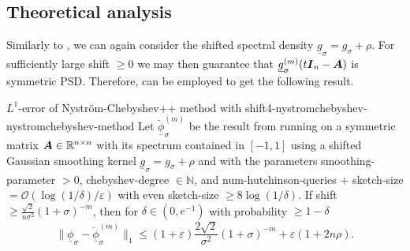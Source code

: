 
\subsection{Theoretical analysis}
\label{subsec:4-nystromchebyshev-analysis}

Similarly to , we can again consider
the shifted spectral density $\underline{g}_{\sigma} = g_{\sigma} + \rho$. For
sufficiently large \gls{shift} $\geq 0$ we may then guarantee that $\underline{g}_{\sigma}^{(m)}(t\boldsymbol{I}_n - \boldsymbol{A})$
is symmetric \gls{PSD}. Therefore,  can be
employed to get the following result.

\begin{theorem}{$L^1$-error of Nystr\"om-Chebyshev++ method with shift}{4-nystromchebyshev-nystromchebyshev-method}
    Let $\breve{\underline{\phi}}_{\sigma}^{(m)}$ be the result from running
     on a symmetric matrix
    $\boldsymbol{A} \in \mathbb{R}^{n \times n}$ with its spectrum contained in $[-1, 1]$
    using a shifted Gaussian smoothing kernel $\underline{g}_{\sigma} = g_{\sigma} + \rho$
    and with the parameters \gls{smoothing-parameter} $>0$, \gls{chebyshev-degree} $\in \mathbb{N}$, and
    \gls{num-hutchinson-queries} $+$ \gls{sketch-size} $=\mathcal{O}(\log(1/\delta)/\varepsilon)$
    with even \gls{sketch-size} $\geq 8 \log(1/\delta)$.
    If \gls{shift} $\geq \frac{\sqrt{2}}{n\sigma^2} (1 + \sigma)^{-m}$, then
    for $\delta \in (0, e^{-1})$ with probability $\geq 1-\delta$
    \begin{equation}
        \lVert \underline{\phi}_{\sigma} - \breve{\underline{\phi}}_{\sigma}^{(m)} \rVert _1
        \leq (1 + \varepsilon)  \frac{2\sqrt{2}}{\sigma^2} (1 + \sigma)^{-m} + \varepsilon(1 + 2 n \rho).
    \end{equation}
\end{theorem}

